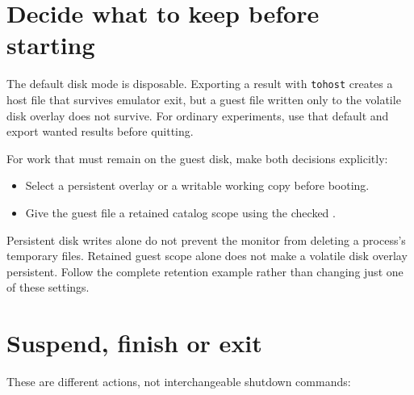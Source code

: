 \section{Decide what to keep before starting}\label{decide-what-to-keep-before-starting}

The default disk mode is disposable. Exporting a result with \passthrough{\lstinline!tohost!} creates a host file that survives emulator exit, but a guest file written only to the volatile disk overlay does not survive. For ordinary experiments, use that default and export wanted results before quitting.

For work that must remain on the guest disk, make both decisions explicitly:

\begin{itemize}
\tightlist
\item
  Select a persistent overlay or a writable working copy before booting.
\item
  Give the guest file a retained catalog scope using the checked .
\end{itemize}

Persistent disk writes alone do not prevent the monitor from deleting a process's temporary files. Retained guest scope alone does not make a volatile disk overlay persistent. Follow the complete retention example rather than changing just one of these settings.

\section{Suspend, finish or exit}\label{suspend-finish-or-exit}

These are different actions, not interchangeable shutdown commands:

